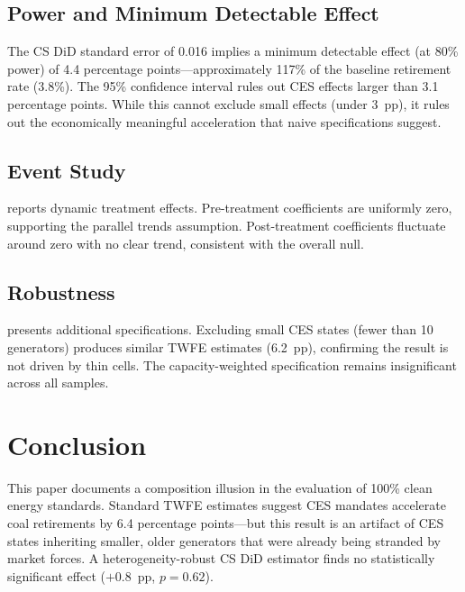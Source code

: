 \documentclass[12pt]{article}
\begin{document}


\subsection{Power and Minimum Detectable Effect}

The CS DiD standard error of 0.016 implies a minimum detectable effect (at 80\% power) of 4.4 percentage points---approximately 117\% of the baseline retirement rate (3.8\%). The 95\% confidence interval rules out CES effects larger than 3.1 percentage points. While this cannot exclude small effects (under 3~pp), it rules out the economically meaningful acceleration that naive specifications suggest.

\subsection{Event Study}

 reports dynamic treatment effects. Pre-treatment coefficients are uniformly zero, supporting the parallel trends assumption. Post-treatment coefficients fluctuate around zero with no clear trend, consistent with the overall null.



\subsection{Robustness}

 presents additional specifications. Excluding small CES states (fewer than 10 generators) produces similar TWFE estimates (6.2~pp), confirming the result is not driven by thin cells. The capacity-weighted specification remains insignificant across all samples.




\section{Conclusion}\label{sec:conclusion}

This paper documents a composition illusion in the evaluation of 100\% clean energy standards. Standard TWFE estimates suggest CES mandates accelerate coal retirements by 6.4 percentage points---but this result is an artifact of CES states inheriting smaller, older generators that were already being stranded by market forces. A heterogeneity-robust CS DiD estimator finds no statistically significant effect ($+0.8$~pp, $p = 0.62$).
\end{document}
